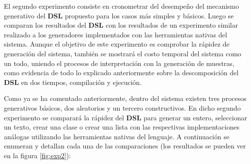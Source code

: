 El segundo experimento consiste en cronometrar del desempeño del mecanismo generativo del {\bf DSL} propuesto para los casos más simples y
básicos. Luego se comparan los resultados del {\bf DSL} con los resultados de un experimento similar realizado a los generadores implementados
con las herramientas nativas del sistema. Aunque el objetivo de este experimento es comprobar la rápidez de generación del sistema,
también se mostrará el costo temporal del sistema como un todo, uniendo el procesos de interpretación con la generación de muestras,
como evidencia de todo lo explicado anteriormente sobre la descomposición del {\bf DSL} en dos tiempos, compilación y ejecución.

Como ya se ha comentado anteriormente, dentro del sistema existen tres procesos generativos básicos, dos aleatorios y un tercero
constructivos. En dicho segundo experimento se comparará la rápidez del {\bf DSL} para generar un entero, seleccionar un texto, crear una
clase o crear una lista con las respectivas implementaciones análogas utilizando las herramientas nativas del lenguaje. A continuación
se enumeran y detallan cada una de las comparaciones (los resultados se pueden ver en la figura \ref{fig:exp2}):
